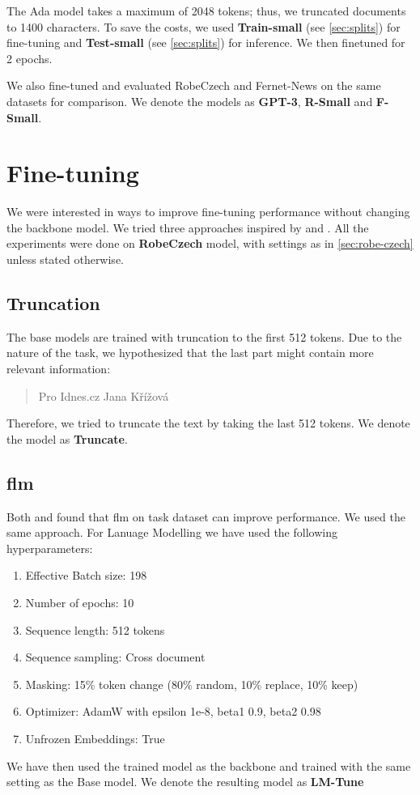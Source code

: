 The Ada model takes a maximum of 2048 tokens; thus, we truncated documents to 1400 characters.
To save the costs, we used \textbf{Train-small} (see \autoref{sec:splits}) for fine-tuning and
\textbf{Test-small} (see \autoref{sec:splits}) for inference.
We then finetuned for 2 epochs.

We also fine-tuned and evaluated RobeCzech and Fernet-News on the same datasets for comparison.
We denote the models as \textbf{GPT-3}, \textbf{R-Small} and \textbf{F-Small}.

\section{Fine-tuning}
\label{sec:finetuning}
We were interested in ways to improve fine-tuning performance without changing the backbone model.
We tried three approaches inspired by \textcite{howardUniversalLanguageModel2018a} and \textcite{sunHowFineTuneBERT2020}.
All the experiments were done on \textbf{RobeCzech} model, with settings as in \autoref{sec:robe-czech}
unless stated otherwise.

\subsection{Truncation}
\label{sec:truncation}
The base models are trained with truncation to the first 512 tokens.
Due to the nature of the task,
we hypothesized that the last part might contain more relevant information:
\begin{quote}
    Pro Idnes.cz Jana Křížová
\end{quote}
Therefore, we tried to truncate the text by taking the last 512 tokens.
We denote the model as \textbf{Truncate}.

\subsection{\acl{flm}}
\label{sec:task-modeling}
Both \textcite{howardUniversalLanguageModel2018a} and \textcite{sunHowFineTuneBERT2020}
found that \acf{flm} on task dataset can improve performance.
We used the same approach.
For Lanuage Modelling we have used the following hyperparameters:
\begin{enumerate}
    \item Effective Batch size: 198
    \item Number of epochs: 10
    \item Sequence length: 512 tokens
    \item Sequence sampling: Cross document
    \item Masking: 15\% token change (80\% random, 10\% replace, 10\% keep)
    \item Optimizer: AdamW with epsilon 1e-8, beta1 0.9, beta2 0.98
    \item Unfrozen Embeddings: True
\end{enumerate} 
We have then used the trained model as the backbone
and trained with the same setting as the Base model.
We denote the resulting model as \textbf{LM-Tune}


